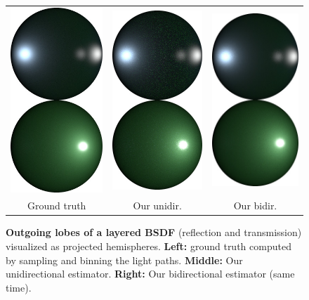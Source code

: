 \begin{figure}[t]
	\centering
	\addtolength{\tabcolsep}{-4pt}
	\begin{tabular}{ccc}
		\includegraphics[width=0.315\columnwidth]{img/validations/lobe_bsdf/bsdf_sample_all.jpg} &
		\includegraphics[width=0.315\columnwidth]{img/validations/lobe_bsdf/bsdf_eval_uni_all.jpg} &
		\includegraphics[width=0.315\columnwidth]{img/validations/lobe_bsdf/bsdf_eval_bi_all.jpg} \\
		Ground truth &
		Our unidir. &
		Our bidir. \\
	\end{tabular}
	\caption{\label{fig:hemispheres}
		\textbf{Outgoing lobes of a layered BSDF} (reflection and transmission) visualized as projected hemispheres. \textbf{Left:} ground truth computed by sampling and binning the light paths. \textbf{Middle:} Our unidirectional estimator. \textbf{Right:} Our bidirectional estimator (same time).
	}
\end{figure}